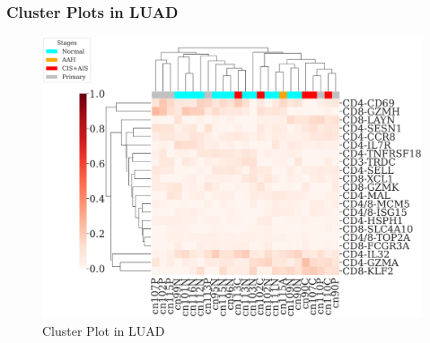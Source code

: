 \documentclass{beamer}
\begin{document}
    \begin{frame}
        \frametitle{Cluster Plots in LUAD}

        \begin{figure}
            \includegraphics[height=0.6 \textheight]{figures/BisqueRNA/clustermap/STAR.ADC.GSE162498.cluster.pdf}
            \caption{Cluster Plot in LUAD}
        \end{figure}
    \end{frame}
\end{document}
